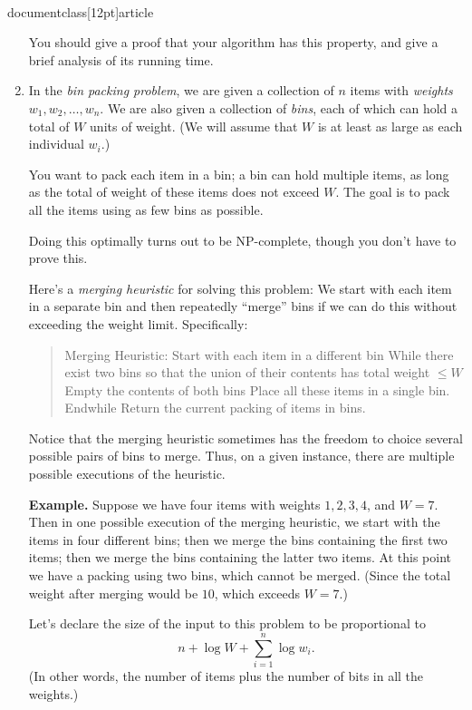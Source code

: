 \\documentclass[12pt]{article}
\begin{document}
\begin{enumerate}
You should give a proof that your algorithm has this property,
and give a brief analysis of its running time.



\item 

In the {\em bin packing problem},
we are given a collection of $n$ items with
{\em weights} $w_1, w_2, \ldots, w_n$.
We are also given a collection of {\em bins},
each of which can hold a total of $W$ units of weight.
(We will assume that $W$ is at least as large as each individual $w_i$.)

You want to pack each item in a bin;
a bin can hold multiple items, as long
as the total of weight of these items does not exceed $W$.
The goal is to pack all the items using as few bins as possible.

Doing this optimally turns out to be NP-complete, though
you don't have to prove this.

\bigskip
Here's a {\em merging heuristic} for solving this problem:
We start with each item in a separate bin and then repeatedly
``merge'' bins if we can do this without exceeding the weight limit.
Specifically:
\begin{quote}
\begin{code}
Merging Heuristic:
  Start with each item in a different bin
  While there exist two bins so that the union of
        their contents has total weight $\leq W$
     Empty the contents of both bins
     Place all these items in a single bin.
  Endwhile
  Return the current packing of items in bins.
\end{code}
\end{quote}
Notice that the merging heuristic sometimes has
the freedom to choice several possible pairs of bins to merge.
Thus, on a given instance, there are multiple possible
executions of the heuristic.

\bigskip
{\bf Example.} Suppose we have four items with weights
$1, 2, 3, 4$, and $W = 7$.
Then in one possible execution of the merging heuristic, we
start with the items in four different bins;
then we merge the bins containing the first two items;
then we merge the bins containing the latter two items.
At this point we have a packing using two bins,
which cannot be merged.
(Since the total weight after merging would be $10$,
which exceeds $W = 7$.)

\bigskip
{} 
Let's declare the size of the
input to this problem to be proportional to
$$n + \log W + \sum_{i=1}^n \log w_i.$$
(In other words, the number of items plus
the number of bits in all the weights.)


\end{enumerate}
\end{document}
